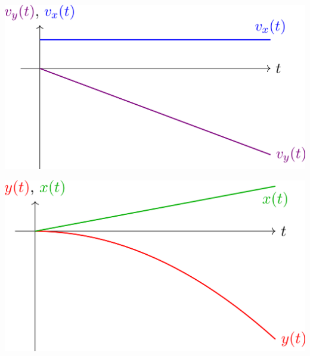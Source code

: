 \documentclass[../../main/main.tex]{subfiles}
\begin{document}
\begin{minipage}{0.48\linewidth}
	\begin{center}
		\includegraphics[width=\linewidth]{vo_vv}
	\end{center}
\end{minipage}
\hfill
\begin{minipage}{0.48\linewidth}
	\begin{center}
		\includegraphics[width=\linewidth]{vo_xx}
	\end{center}
\end{minipage} \bigbreak
\end{document}
